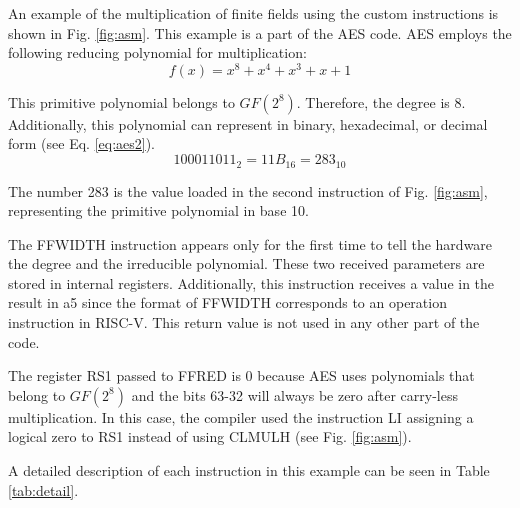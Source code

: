 An example of the multiplication of finite fields using the custom instructions is shown in Fig. \ref{fig:asm}. 
This example is a part of the AES code. AES employs the following reducing polynomial for multiplication:
\begin{equation}
    f(x) = x^{8} + x^{4} + x^{3} + x + 1
    \label{eq:aes}
\end{equation}

This primitive polynomial belongs to $GF(2^8)$. Therefore, the degree is 8. Additionally, this polynomial can represent in binary, 
hexadecimal, or decimal form (see Eq. \ref{eq:aes2}). 
\begin{equation}
    100011011_{2}=11B_{16}=283_{10}
    \label{eq:aes2}
\end{equation}


The number 283 is the value loaded in the second instruction of Fig. \ref{fig:asm}, representing the primitive polynomial in base 10.

The FFWIDTH instruction appears only for the first time to tell the hardware 
the degree and the irreducible polynomial. These two received parameters are stored in internal registers. 
Additionally, this instruction receives a value in the result in a5 since the format of FFWIDTH corresponds to an 
operation instruction in RISC-V. This return value is not used in any other part of the code.


The register RS1 passed to FFRED is 0 because AES uses polynomials that belong to $GF(2^8)$ 
and the bits 63-32 will always be zero after carry-less multiplication. In this case, the compiler used the instruction 
LI assigning a logical zero to RS1 instead of using CLMULH (see Fig. \ref{fig:asm}). 

A detailed description of each instruction in this example can be seen in Table \ref{tab:detail}.



